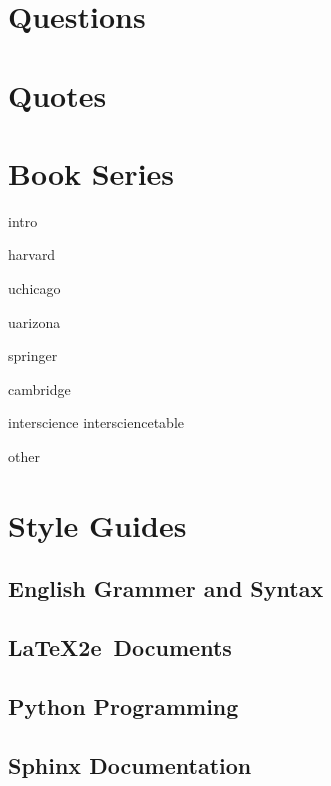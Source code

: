 \documentclass{book}
\begin{document}
\chapter{Questions}

\chapter{Quotes}

\chapter{Book Series}
{intro}

{harvard}

{uchicago}

{uarizona}

{springer}

{cambridge}

{interscience}
{intersciencetable}

{other}


\chapter{Style Guides}
\section{English Grammer and Syntax}

\section{\LaTeX2e\ Documents}

\section{Python Programming}

\section{Sphinx Documentation}
\end{document}
